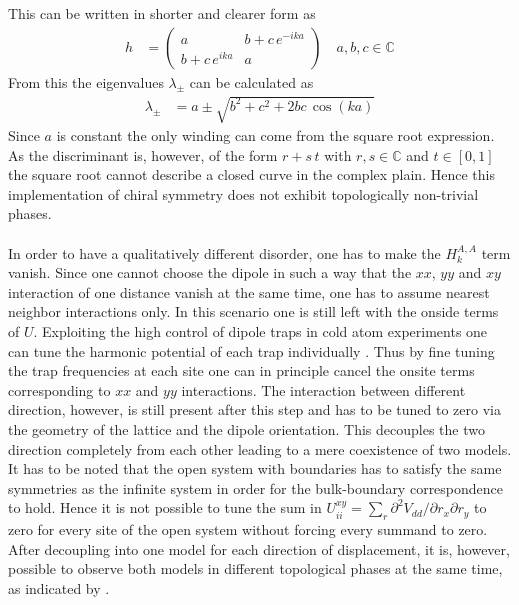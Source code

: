 This can be written in shorter and clearer form as
\begin{align*}
    h&=\begin{pmatrix}
        a & b+c\,e^{-ika}\\
        b+c\,e^{ika}& a
    \end{pmatrix}\quad a,b,c\in\mathbb{C}
\end{align*}
From this the eigenvalues $\lambda_\pm$ can be calculated as
\begin{align*}
    \lambda_\pm&= a\pm\sqrt{b^2+c^2+2bc\,\cos(ka)}
\end{align*}
Since $a$ is constant the only winding can come from the square root expression. As the discriminant is, however, of the form $r+s\,t$ with $r,s\in\mathbb{C}$ and $t\in[0,1]$ the square root cannot describe a closed curve in the complex plain. Hence this implementation of chiral symmetry does not exhibit topologically non-trivial phases.\\\\
In order to have a qualitatively different disorder, one has to make the $H_k^{A,A}$ term vanish. Since one cannot choose the dipole in such a way that the $xx$, $yy$ and $xy$ interaction of one distance vanish at the same time, one has to assume nearest neighbor interactions only. In this scenario one is still left with the onside terms of $U$. Exploiting the high control of dipole traps in cold atom experiments one can tune the harmonic potential of each trap individually \cite{endresAtombyatomAssemblyDefectfree2016,youngHalfminutescaleAtomicCoherence2020}.
Thus by fine tuning the trap frequencies at each site one can in principle cancel the onsite terms corresponding to $xx$ and $yy$ interactions. The interaction between different direction, however, is still present after this step and has to be tuned to zero via the geometry of the lattice and the dipole orientation. This decouples the two direction completely from each other leading to a mere coexistence of two models. It has to be noted that the open system with boundaries has to satisfy the same symmetries as the infinite system in order for the bulk-boundary correspondence to hold. Hence it is not possible to tune the sum in $U_{ii}^{xy}=\sum_r\partial^2V_{dd}/\partial r_x\partial r_y$ to zero for every site of the open system without forcing every summand to zero. 
After decoupling into one model for each direction of displacement, it is, however, possible to observe both models in different topological phases at the same time, as indicated by .
